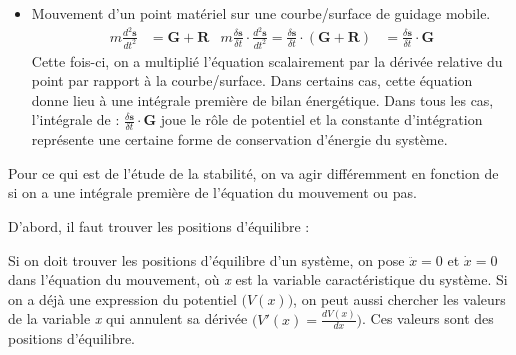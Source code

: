 \documentclass[a4paper]{article}
\begin{document}
\begin{tcolorbox}[title=E. Courbe de guidage mobile, colback=white, colframe=orange, rounded corners]
\begin{enumerate}
\begin{itemize}
    \item Mouvement d'un point matériel sur une courbe/surface de guidage mobile.
    \begin{align*} m \frac{d^2 \textbf{s}}{d t^2} &= \textbf{G} + \textbf{R} &m \frac{\delta \textbf{s}}{\delta t} \cdot \frac{d^2 \textbf{s}}{d t^2} = \frac{\delta \textbf{s}}{\delta t} \cdot (\textbf{G} + \textbf{R}) &= \frac{\delta \textbf{s}}{\delta t} \cdot \textbf{G} \end{align*}
    Cette fois-ci, on a multiplié l'équation scalairement par la dérivée relative du point par rapport à la courbe/surface. Dans certains cas, cette équation donne lieu à une intégrale première de bilan énergétique. Dans tous les cas, l'intégrale de : $\displaystyle \frac{\delta \textbf{s}}{\delta t} \cdot \textbf{G} $ joue le rôle de potentiel et la constante d'intégration représente une certaine forme de conservation d'énergie du système.
\end{itemize}
\end{enumerate}

\end{tcolorbox}





Pour ce qui est de l'étude de la stabilité, on va agir différemment en fonction de si on a une intégrale première de l'équation du mouvement ou pas.

D'abord, il faut trouver les positions d'équilibre : 

\begin{tcolorbox}[title=F. Détermination des positions d'équilibre]
Si on doit trouver les positions d'équilibre d'un système, on pose $ \ddot{x} = 0 $ et $ \dot{x} = 0 $ dans l'équation du mouvement, où \emph{x} est la variable caractéristique du système. Si on a déjà une expression du potentiel $ \big( V(x) \big) $, on peut aussi chercher les valeurs de la variable \emph{x} qui annulent sa dérivée $\displaystyle \Big( V'(x) = \frac{d V(x)}{d x} \Big) $. Ces valeurs sont des positions d'équilibre.
\end{tcolorbox}
\end{document}
